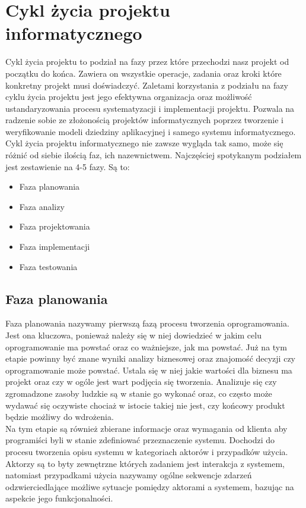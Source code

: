 \documentclass[oneside,polski,logo]{amuthesis}
\begin{document}
\section{Cykl życia projektu informatycznego}
Cykl życia projektu to podział na fazy przez które przechodzi nasz projekt od początku do końca. Zawiera on wszystkie operacje, zadania oraz kroki które konkretny projekt musi doświadczyć. Zaletami korzystania z podziału na fazy cyklu życia projektu jest jego efektywna organizacja oraz możliwość ustandaryzowania procesu systematyzacji i implementacji projektu. Pozwala na radzenie sobie ze złożonością projektów informatycznych poprzez tworzenie i weryfikowanie modeli dziedziny aplikacyjnej i samego systemu informatycznego.\cite{IO- Helion} Cykl życia projektu informatycznego nie zawsze wygląda tak samo, może się różnić od siebie ilością faz, ich nazewnictwem. Najczęściej spotykanym podziałem jest zestawienie na 4-5 fazy. Są to: \\
\begin{itemize}
	\item Faza planowania
	\item Faza analizy
	\item Faza projektowania
	\item Faza implementacji
	\item Faza testowania \\
\end{itemize}
\subsection {Faza planowania}
Faza planowania nazywamy pierwszą fazą procesu tworzenia oprogramowania. Jest ona kluczowa, ponieważ należy się w niej dowiedzieć w jakim celu oprogramowanie ma powstać oraz co ważniejsze, jak ma powstać. Już na tym etapie powinny być znane wyniki analizy biznesowej oraz znajomość decyzji czy oprogramowanie może powstać. Ustala się w niej jakie wartości dla biznesu ma projekt oraz czy w ogóle jest wart podjęcia się tworzenia. Analizuje się czy zgromadzone zasoby ludzkie są w stanie go wykonać oraz, co często może wydawać się oczywiste chociaż w istocie takiej nie jest, czy końcowy produkt będzie możliwy do wdrożenia. \\
Na tym etapie są również zbierane informacje oraz wymagania od klienta aby programiści byli w stanie zdefiniować przeznaczenie systemu. Dochodzi do procesu tworzenia opisu systemu w kategoriach aktorów i przypadków użycia. Aktorzy są to byty zewnętrzne których zadaniem jest interakcja z systemem, natomiast przypadkami użycia nazywamy ogólne sekwencje zdarzeń odzwierciedlające możliwe sytuacje pomiędzy aktorami a systemem, bazując na aspekcie jego funkcjonalności.
\end{document}
